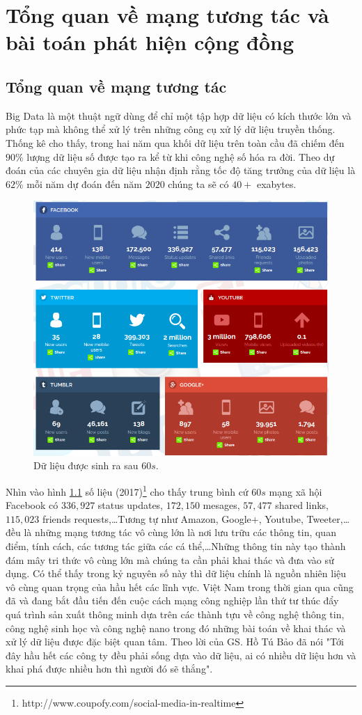 \chapter{Tổng quan về mạng tương tác và bài toán phát hiện cộng đồng}\label{chap:c1}
\ifpdf
    \graphicspath{{Chapter1/Chapter1Figs/PNG/}{Chapter1/Chapter1Figs/PDF/}{Chapter1/Chapter1Figs/}}
\else
    \graphicspath{{Chapter1/Chapter1Figs/EPS/}{Chapter1/Chapter1Figs/}}
\fi
\section{Tổng quan về mạng tương tác}

Big Data là một thuật ngữ dùng để chỉ một tập hợp dữ liệu có kích thước lớn và phức tạp mà không thể xử lý trên những công cụ xử lý dữ liệu truyền thống. Thống kê cho thấy, trong hai năm qua khối dữ liệu trên toàn cầu đã chiếm đến $90\%$ lượng dữ liệu số được tạo ra kể từ khi công nghệ số hóa ra đời. Theo dự đoán của các chuyên gia dữ liệu nhận định rằng tốc độ tăng trưởng của dữ liệu là $62\%$ mỗi năm dự đoán đến năm $2020$ chúng ta sẽ có $40+$ exabytes. 

\begin{figure}[h]
	\centering
	\includegraphics[width=0.6\linewidth]{Chapter1/Chapter1Figs/numberofsocialnetwork}
	\caption{Dữ liệu được sinh ra sau $60s$.}
	\label{fig:numbersocialnetwork}
\end{figure}

Nhìn vào hình \ref{fig:numbersocialnetwork} số liệu (2017)\footnote{http://www.coupofy.com/social-media-in-realtime} cho thấy trung bình cứ $60s$ mạng xã hội Facebook có $336,927$ status updates, $172,150$ mesages, $57,477$ shared links, $115,023$ friends requests,\dots Tương tự như Amazon, Google+, Youtube, Tweeter,\dots đều là những mạng tương tác vô cùng lớn là nơi lưu trữu các thông tin, quan điểm, tính cách, các tương tác giữa các cá thể,\dots Những thông tin này tạo thành đám mây tri thức vô cùng lớn mà chúng ta cần phải khai thác và đưa vào sử dụng. Có thể thấy trong kỷ nguyên số này thì dữ liệu chính là nguồn nhiên liệu vô cùng quan trọng của hầu hết các lĩnh vực. Việt Nam trong thời gian qua cũng đã và đang bắt đầu tiến đến cuộc cách mạng công nghiệp lần thứ tư thúc đẩy quá trình sản xuất thông minh dựa trên các thành tựu về công nghệ thông tin, công nghệ sinh học và công nghệ nano trong đó những bài toán về khai thác và xử lý dữ liệu được đặc biệt quan tâm. Theo lời của GS. Hồ Tú Bảo đã nói "Tới đây hầu hết các công ty đều phải sống dựa vào dữ liệu, ai có nhiều dữ liệu hơn và khai phá được nhiều hơn thì người đó sẽ thắng".

